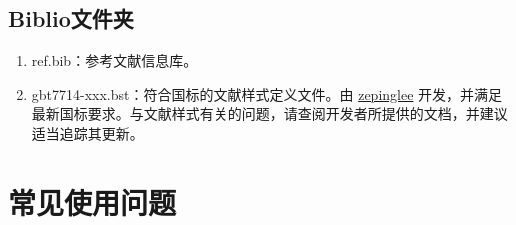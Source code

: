 \subsection{Biblio文件夹}

\begin{enumerate}
    \item ref.bib：参考文献信息库。
    \item gbt7714-xxx.bst：符合国标的文献样式定义文件。由 \href{https://github.com/zepinglee/gbt7714-bibtex-style}{zepinglee}  开发，并满足最新国标要求。与文献样式有关的问题，请查阅开发者所提供的文档，并建议适当追踪其更新。
\end{enumerate}

\section{常见使用问题}\label{sec:qa}

